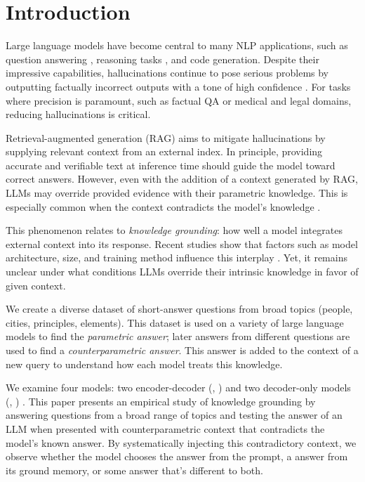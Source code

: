 \section{Introduction}

Large language models have become central to many NLP applications, such as question answering \cite{gpt3,how_can_we_know}, reasoning tasks \cite{treeofthoughts}, and code generation.
Despite their impressive capabilities, hallucinations continue to pose serious problems by outputting factually incorrect outputs with a tone of high confidence \cite{how_can_we_know}.
For tasks where precision is paramount, such as factual QA or medical and legal domains, reducing hallucinations is critical.

Retrieval-augmented generation (RAG) \cite{rag} aims to mitigate hallucinations by supplying relevant context from an external index.
In principle, providing accurate and verifiable text at inference time should guide the model toward correct answers.
However, even with the addition of a context generated by RAG, LLMs may override provided evidence with their parametric knowledge.
This is especially common when the context contradicts the model's knowledge \cite{factual_recall,ragged}.

This phenomenon relates to \emph{knowledge grounding}: how well a model integrates external context into its response.
Recent studies show that factors such as model architecture, size, and training method influence this interplay \cite{factual_recall,flant5,llama}.
Yet, it remains unclear under what conditions LLMs override their intrinsic knowledge in favor of given context.

We create a diverse dataset of short-answer questions from broad topics (people, cities, principles, elements).
This dataset is used on a variety of large language models to find the \emph{parametric answer}; later answers from different questions are used to find a \emph{counterparametric answer}.
This answer is added to the context of a new query to understand how each model treats this knowledge.

We examine four models: two encoder-decoder (\smallflan{}, \bigflan{}) \cite{t5,flant5} and two decoder-only models (\smallllama{}, \bigllama{}) \cite{llama3}.
This paper presents an empirical study of knowledge grounding by answering questions from a broad range of topics and testing the answer of an LLM when presented with counterparametric context that contradicts the model's known answer.
By systematically injecting this contradictory context, we observe whether the model chooses the \Contextual{} answer from the prompt, a \Parametric{} answer from its ground memory, or some \Other{} answer that's different to both.

